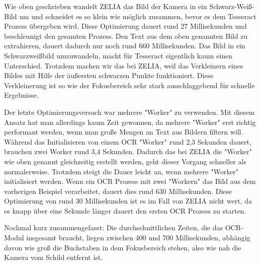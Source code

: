 Wie oben geschrieben wandelt ZELIA das Bild der Kamera in ein Schwarz-Weiß-Bild um und schneidet es so klein wie möglich zusammen, bevor es dem Tesseract Prozess übergeben wird. Diese Optimierung dauert rund 27 Millisekunden und beschleunigt den gesamten Prozess. Den Text aus dem oben genannten Bild zu extrahieren, dauert dadurch nur noch rund 660 Millisekunden. Das Bild in ein Schwarzweißbild umzuwandeln, macht für Tesseract eigentlich kaum einen Unterschied. Trotzdem machen wir das bei ZELIA, weil das Verkleinern eines Bildes mit Hilfe der äußersten schwarzen Punkte funktioniert. Diese Verkleinerung ist so wie der Fokusbereich sehr stark ausschlaggebend für schnelle Ergebnisse. 

Der letzte Optimierungsversuch war mehrere "Worker" zu verwenden. Mit diesem Ansatz hat man allerdings kaum Zeit gewonnen, da mehrere "Worker" erst richtig performant werden, wenn man große Mengen an Text aus Bildern filtern will. Während das Initialisieren von einem OCR "Worker" rund 2,3 Sekunden dauert, brauchen zwei Worker rund 3,4 Sekunden. Dadurch das bei ZELIA die "Worker" wie oben genannt gleichzeitig erstellt werden, geht dieser Vorgang schneller als normalerweise. Trotzdem steigt die Dauer leicht an, wenn mehrere "Worker" initialisiert werden. Wenn ein OCR Prozess mit zwei "Workern" das Bild aus dem vorherigen Beispiel verarbeitet, dauert dies rund 630 Millisekunden. Diese Optimierung von rund 30 Millisekunden ist es im Fall von ZELIA nicht wert, da es knapp über eine Sekunde länger dauert den ersten OCR Prozess zu starten.

Nochmal kurz zusammengefasst: Die durchschnittlichen Zeiten, die das OCR-Modul insgesamt braucht, liegen zwischen 400 und 700 Millisekunden, abhängig davon wie groß die Buchstaben in dem Fokusbereich stehen, also wie nah die Kamera vom Schild entfernt ist.

